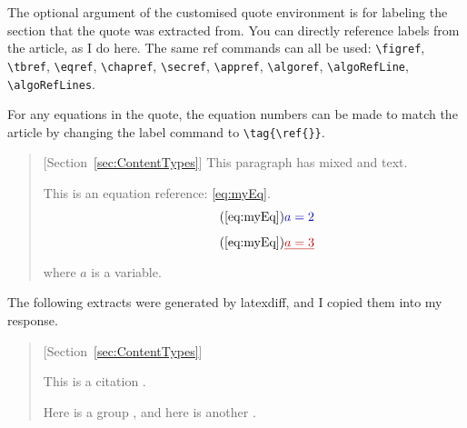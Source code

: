 \documentclass{AuthorResponse}
\newcommand{\figref}[1]{Fig.~\ref{#1}}
\newcommand{\tbref}[1]{Table~\ref{#1}}
\newcommand{\secref}[1]{Section~\ref{#1}}
\begin{document}
The optional argument of the customised quote environment is for labeling the section that the quote was extracted from. You can directly reference labels from the article, as I do here. The same ref commands can all be used: \verb|\figref|, \verb|\tbref|, \verb|\eqref|, \verb|\chapref|, \verb|\secref|, \verb|\appref|, \verb|\algoref|, \verb|\algoRefLine|, \verb|\algoRefLines|.

For any equations in the quote, the equation numbers can be made to match the article by changing the label command to \verb|\tag{\ref{}}|.

\begin{quote}[\secref{sec:ContentTypes}]
	This paragraph has mixed  and  text.



	This is an equation reference: \eqref{eq:myEq}.
	\begin{equation} \tag{\ref{eq:myEq}}
		\DIFadd{a = 2}
	\end{equation}
	\begin{equation} \tag{\ref{eq:myEq}}
		\DIFdel{a = 3}
	\end{equation}
	where $a$ is a variable.
\end{quote}

The following extracts were generated by latexdiff, and I copied them into my response.

\begin{quote}[\secref{sec:ContentTypes}]

 This is a citation \cite{example1}  .

Here is a group  \DIFdel{\mbox{%
[1,2,3,4]}\hskip0pt%
}   , and here is another  \DIFdel{\mbox{%
[3,4]}\hskip0pt%
}   .
\end{quote}
\end{document}

